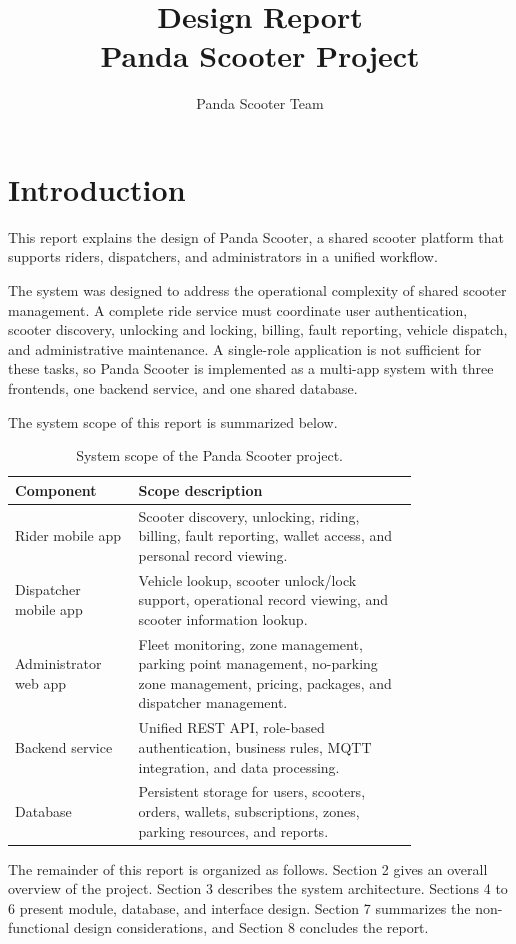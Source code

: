 \documentclass[12pt,a4paper]{article}
\title{\textbf{Design Report}\\Panda Scooter Project}
\author{Panda Scooter Team}
\date{}
\begin{document}
\maketitle
\tableofcontents
\newpage

\section{Introduction}

This report explains the design of Panda Scooter, a shared scooter platform that supports riders, dispatchers, and administrators in a unified workflow.

The system was designed to address the operational complexity of shared scooter management. A complete ride service must coordinate user authentication, scooter discovery, unlocking and locking, billing, fault reporting, vehicle dispatch, and administrative maintenance. A single-role application is not sufficient for these tasks, so Panda Scooter is implemented as a multi-app system with three frontends, one backend service, and one shared database.

The system scope of this report is summarized below.

\begin{table}[H]
\centering
\begin{tabular}{p{0.24\linewidth} p{0.56\linewidth}}
\toprule
\textbf{Component} & \textbf{Scope description} \\
\midrule
Rider mobile app & Scooter discovery, unlocking, riding, billing, fault reporting, wallet access, and personal record viewing. \\
Dispatcher mobile app & Vehicle lookup, scooter unlock/lock support, operational record viewing, and scooter information lookup. \\
Administrator web app & Fleet monitoring, zone management, parking point management, no-parking zone management, pricing, packages, and dispatcher management. \\
Backend service & Unified REST API, role-based authentication, business rules, MQTT integration, and data processing. \\
Database & Persistent storage for users, scooters, orders, wallets, subscriptions, zones, parking resources, and reports. \\
\bottomrule
\end{tabular}
\caption{System scope of the Panda Scooter project.}
\end{table}

The remainder of this report is organized as follows. Section 2 gives an overall overview of the project. Section 3 describes the system architecture. Sections 4 to 6 present module, database, and interface design. Section 7 summarizes the non-functional design considerations, and Section 8 concludes the report.
\end{document}
